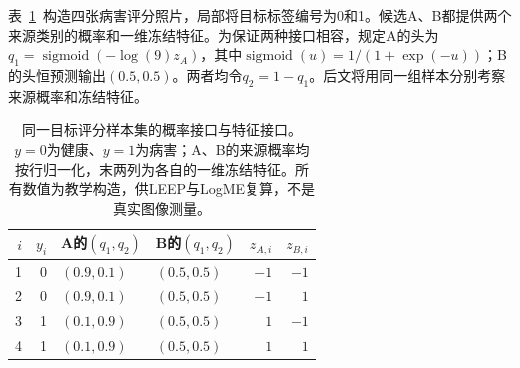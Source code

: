 表~\ref{tab:ket-reuse-score-data}~构造四张病害评分照片，局部将目标标签编号为0和1。候选A、B都提供两个来源类别的概率和一维冻结特征。为保证两种接口相容，规定A的头为$q_1=\operatorname{sigmoid}(-\log(9)z_A)$，其中$\operatorname{sigmoid}(u)=1/(1+\exp(-u))$；B的头恒预测输出$(0.5,0.5)$。两者均令$q_2=1-q_1$。后文将用同一组样本分别考察来源概率和冻结特征。

\begin{table}[htbp]
  \centering
  \small
  \begin{tabularx}{\linewidth}{rrXXrr}
    \toprule
    $i$ & $y_i$ & A的$(q_1,q_2)$ & B的$(q_1,q_2)$ & $z_{A,i}$ & $z_{B,i}$ \\
    \midrule
    1 & 0 & $(0.9,0.1)$ & $(0.5,0.5)$ & $-1$ & $-1$ \\
    2 & 0 & $(0.9,0.1)$ & $(0.5,0.5)$ & $-1$ & $1$ \\
    3 & 1 & $(0.1,0.9)$ & $(0.5,0.5)$ & $1$ & $-1$ \\
    4 & 1 & $(0.1,0.9)$ & $(0.5,0.5)$ & $1$ & $1$ \\
    \bottomrule
  \end{tabularx}
  \caption{同一目标评分样本集的概率接口与特征接口。$y=0$为健康、$y=1$为病害；A、B的来源概率均按行归一化，末两列为各自的一维冻结特征。所有数值为教学构造，供LEEP与LogME复算，不是真实图像测量。}
  \label{tab:ket-reuse-score-data}
\end{table}

